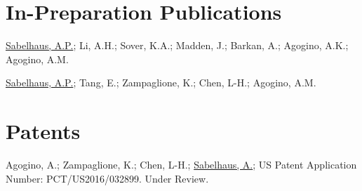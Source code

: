 \documentclass[letterpaper]{deedy-resume} %
\begin{document}
{\begin{etaremune}
\end{etaremune}  

  
\section{In-Preparation Publications}

\vspace{0.2cm}

\begin{etaremune}


\item {} \underline{Sabelhaus, A.P.}; Li, A.H.; Sover, K.A.; Madden, J.; Barkan, A.;  Agogino, A.K.; Agogino, A.M.


\item {} \underline{Sabelhaus, A.P.}; Tang, E.; Zampaglione, K.; Chen, L-H.; Agogino, A.M.
  

\end{etaremune}


\section{Patents}

\vspace{0.2cm}

\begin{etaremune}

\item {} Agogino, A.; Zampaglione, K.; Chen, L-H.; \underline{Sabelhaus, A.}; US Patent Application Number: PCT/US2016/032899. Under Review.


\end{etaremune}}
\end{document}
